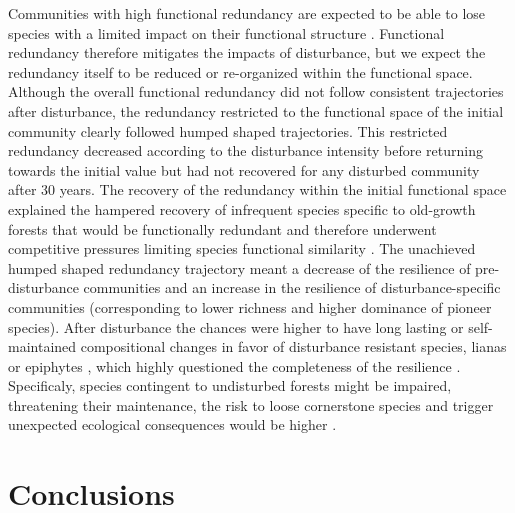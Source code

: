 \documentclass[fleqn,10pt]{ArtEcoFoG} %
\theoremstyle{definition}
\theoremstyle{definition}
\theoremstyle{definition}
\theoremstyle{remark}
\begin{document}
Communities with high functional redundancy are expected to be able to
lose species with a limited impact on their functional structure
\citep{Carmona2016}. Functional redundancy therefore mitigates the
impacts of disturbance, but we expect the redundancy itself to be
reduced or re-organized within the functional space. Although the
overall functional redundancy did not follow consistent trajectories
after disturbance, the redundancy restricted to the functional space of
the initial community clearly followed humped shaped trajectories. This
restricted redundancy decreased according to the disturbance intensity
before returning towards the initial value but had not recovered for any
disturbed community after 30 years. The recovery of the redundancy
within the initial functional space explained the hampered recovery of
infrequent species specific to old-growth forests that would be
functionally redundant and therefore underwent competitive pressures
limiting species functional similarity \citep{Mayfield2010}. The
unachieved humped shaped redundancy trajectory meant a decrease of the
resilience of pre-disturbance communities and an increase in the
resilience of disturbance-specific communities (corresponding to lower
richness and higher dominance of pioneer species). After disturbance the
chances were higher to have long lasting or self-maintained
compositional changes in favor of disturbance resistant species, lianas
or epiphytes \citep{Haddad2008, Burslem2000, Martin2013}, which highly
questioned the completeness of the resilience \citep{Chazdon2003a}.
Specificaly, species contingent to undisturbed forests might be
impaired, threatening their maintenance, the risk to loose cornerstone
species and trigger unexpected ecological consequences would be higher
\citep{Jones1994, Diaz2005, Gardner2007}.

\section{Conclusions}\label{conclusions}
\end{document}
